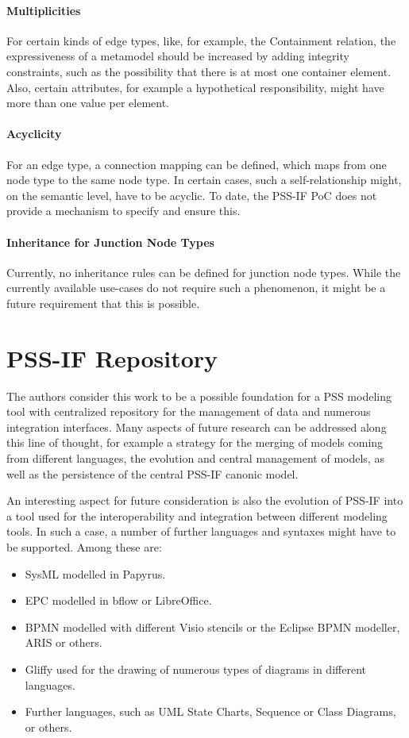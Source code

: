 \paragraph{Multiplicities}

For certain kinds of edge types, like, for example, the Containment relation, the expressiveness of a metamodel should be increased by adding integrity constraints, such as the possibility that there is at most one container element. Also, certain attributes, for example a hypothetical responsibility, might have more than one value per element.

\paragraph{Acyclicity}

For an edge type, a connection mapping can be defined, which maps from one node type to the same node type. In certain cases, such a self-relationship might, on the semantic level, have to be acyclic. To date, the PSS-IF PoC does not provide a mechanism to specify and ensure this.

\paragraph{Inheritance for Junction Node Types}

Currently, no inheritance rules can be defined for junction node types. While the currently available use-cases do not require such a phenomenon, it might be a future requirement that this is possible.

\section{PSS-IF Repository}
\label{sec:outlook:repo}

The authors consider this work to be a possible foundation for a PSS modeling tool with centralized repository for the management of data and numerous integration interfaces. Many aspects of future research can be addressed along this line of thought, for example a strategy for the merging of models coming from different languages, the evolution and central management of models, as well as the persistence of the central PSS-IF canonic model.

An interesting aspect for future consideration is also the evolution of PSS-IF into a tool used for the interoperability and integration between different modeling tools. In such a case, a number of further languages and syntaxes might have to be supported. Among these are:

\begin{itemize}
\item SysML modelled in Papyrus.
\item EPC modelled in bflow or LibreOffice.
\item BPMN modelled with different Visio stencils or the Eclipse BPMN modeller, ARIS or others.
\item Gliffy used for the drawing of numerous types of diagrams in different languages.
\item Further languages, such as UML State Charts, Sequence or Class Diagrams, or others.
\end{itemize}